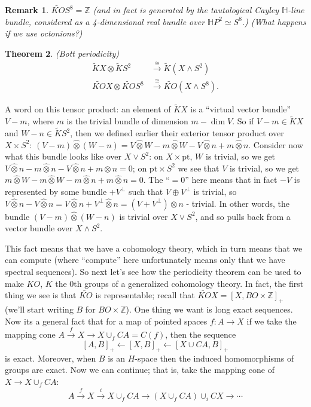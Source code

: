 \documentclass{article}
\newcommand{\Z}{\mathbb{Z}}
\newcommand{\sprod}{\wedge}
\newcommand{\wsum}{\vee}
\newcommand{\ptspace}{\mathrm{pt}}
\newcommand{\from}{\leftarrow}
\newtheorem{thm}{Theorem}[section]
\newtheorem{rem}[thm]{Remark}
\begin{document}
\begin{rem}
$\widetilde{KO} S^8 = \Z$ (and in fact is generated by the tautological Cayley $\mathbb{H}$-line bundle, considered as a 4-dimensional real bundle over $\mathbb{H}P^2 \simeq S^8$.)  (What happens if we use octonions?)
\end{rem}

\begin{thm}(Bott periodicity)
\begin{align*}
\tilde K X \otimes \tilde K S^2 & \stackrel{\cong}{\to} \tilde K(X \sprod S^2) \\
\widetilde{KO} X \otimes \widetilde{KO} S^8 & \stackrel{\cong}{\to} \widetilde{KO}(X \sprod S^8).
\end{align*}
\end{thm}

A word on this tensor product: an element of $\tilde K X$ is a ``virtual vector bundle'' $V - m$, where $m$ is the trivial bundle of dimension $m - \dim V$.  So if $V - m \in \tilde KX$ and $W - n \in \tilde KS^2$, then we defined earlier their exterior tensor product over $X \times S^2$: $(V - m)\hat\otimes(W - n) = V \hat\otimes W - m \hat\otimes W - V \hat\otimes n + m \hat\otimes n$.  Consider now what this bundle looks like over $X \vee S^2$: on $X \times \ptspace$, $W$ is trivial, so we get $V \hat\otimes n - m \hat\otimes n - V \hat\otimes n + m \hat\otimes n = 0$; on $\ptspace \times S^2$ we see that $V$ is trivial, so we get $m \hat\otimes W - m \hat\otimes W - m \hat\otimes n + m \hat\otimes n = 0$.  The ``$= 0$'' here means that in fact $-V$ is represented by some bundle $ + V^\perp$ such that $V \oplus V^\perp$ is trivial, so $V \hat\otimes n - V \hat\otimes n = V \hat\otimes n + V^\perp \hat\otimes n = (V + V^\perp)\otimes n$ - trivial.  In other words, the bundle $(V - m) \hat\otimes (W - n)$ is trivial over $X \wsum S^2$, and so pulls back from a vector bundle over $X \sprod S^2$.

This fact means that we have a cohomology theory, which in turn means that we can compute (where ``compute'' here unfortunately means only that we have spectral sequences).  So next let's see how the periodicity theorem can be used to make $KO$, $K$ the $0$th groups of a generalized cohomology theory.  In fact, the first thing we see is that $\widetilde{KO}$ is representable; recall that $\widetilde{KO} X = [X, BO \times \Z]_+$ (we'll start writing $B$ for $BO \times \Z$).  One thing we want is long exact sequences.  Now its a general fact that for a map of pointed spaces $f: A \to X$ if we take the mapping cone $A \stackrel{f}{\to} X \to X \cup_f CA = C(f)$, then the sequence
\[
[A, B]_+ \from [X, B]_+ \from [X \cup CA, B]_+
\]
is exact.  Moreover, when $B$ is an $H$-space then the induced homomorphisms of groups are exact.  Now we can continue; that is, take the mapping cone of $X \to X \cup_f CA$:
\[
A \stackrel{f}{\to} X \stackrel{i}{\to} X \cup_f CA \to (X \cup_f CA) \cup_i CX \to \cdots
\]
\end{document}
